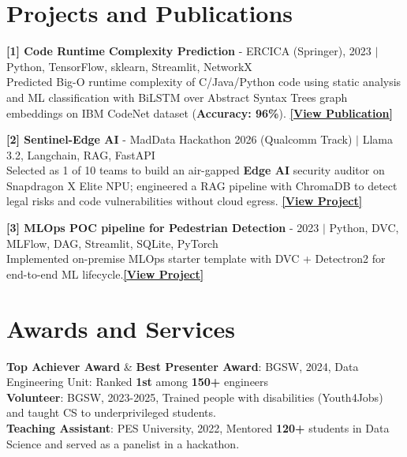 \documentclass[letterpaper,11pt]{article}
\begin{document}
\section{Projects and Publications}

    \begin{itemize}[leftmargin=0.15in, label={}]
    \small{\item{
    \textbf{[1] Code Runtime Complexity Prediction} {- ERCICA (Springer), 2023 $|$ Python, TensorFlow, sklearn, Streamlit, NetworkX }\\
    {Predicted Big-O runtime complexity of C/Java/Python code using static analysis and ML classification with BiLSTM over Abstract Syntax Trees graph embeddings on IBM CodeNet dataset (\textbf{Accuracy: 96\%}).} {\href{https://doi.org/10.1007/978-981-99-7622-5_26}{\textbf{[View Publication]}}}\vspace{0.5pt}

    \textbf{[2] Sentinel-Edge AI} {- MadData Hackathon 2026 (Qualcomm Track) $|$ Llama 3.2, Langchain, RAG, FastAPI} \\
    {Selected as 1 of 10 teams to build an air-gapped \textbf{Edge AI} security auditor on Snapdragon X Elite NPU; engineered a RAG pipeline with ChromaDB to detect legal risks and code vulnerabilities without cloud egress.} {\href{https://github.com/NikhilAdyapak/SentinelAI}{\textbf{[View Project]}}}\vspace{0.5pt}

    \textbf{[3] MLOps POC pipeline for Pedestrian Detection} {- 2023 $|$ Python, DVC, MLFlow, DAG, Streamlit, SQLite, PyTorch} \\
    {Implemented on-premise MLOps starter template with DVC + Detectron2 for end-to-end ML lifecycle.}{\href{https://github.com/NikhilAdyapak/DVC_Detectron2}{\textbf{[View Project]}}}}\vspace{0.5pt}
     
     }
    \end{itemize}

\section{Awards and Services}

    \begin{itemize}[leftmargin=0.15in, label={}]\small{\item{
    \textbf{Top Achiever Award} \& \textbf{Best Presenter Award}: BGSW, 2024, Data Engineering Unit: Ranked \textbf{1st} among \textbf{150+} engineers\\ \vspace{0.5pt}
    \textbf{Volunteer}: BGSW, 2023-2025, Trained people with disabilities (Youth4Jobs) and taught CS to underprivileged students.\\ \vspace{0.5pt}
    \textbf{Teaching Assistant}: PES University, 2022, Mentored \textbf{120+} students in Data Science and served as a panelist in a hackathon.\\
   }}
\end{itemize}
    
\end{document}
